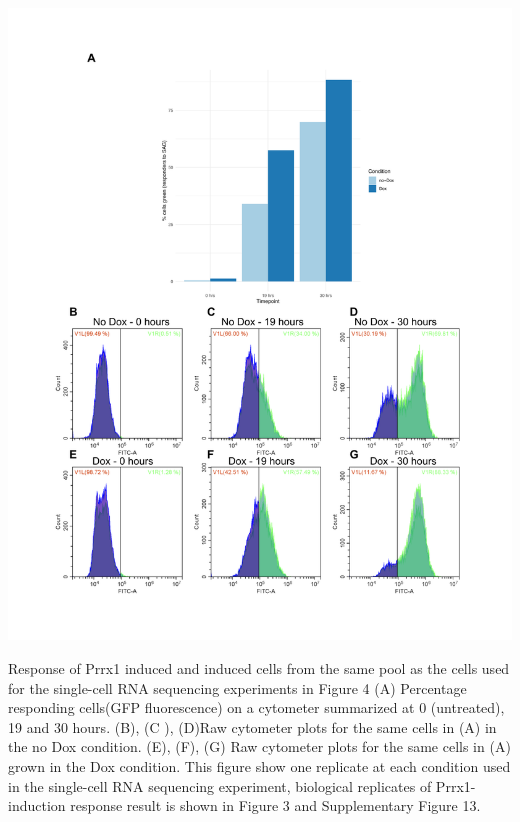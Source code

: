 \begin{suppfigure}[p]  
    \centering
    \includegraphics[width=\linewidth]{figures/hedgehog/SuppFigure20.png}
    \caption[Flow Cytometry results for cells used in Prrx1 induction single-cell RNA sequencing experiment]{
        Response of Prrx1 induced and induced cells from the same pool as the cells used for the single-cell RNA sequencing experiments in Figure 4 (A) Percentage responding cells(GFP fluorescence) on a cytometer summarized  at 0 (untreated), 19 and 30 hours. (B), (C ), (D)Raw cytometer plots for the same cells in (A) in the no Dox condition. (E), (F), (G) Raw cytometer plots for the same cells in (A) grown in the Dox condition. This figure show one replicate at each condition used in the single-cell RNA sequencing experiment, biological replicates of Prrx1-induction response result is shown in Figure 3 and Supplementary Figure 13. 
    }
    \label{fig:hh_figureS20}
\end{suppfigure}


